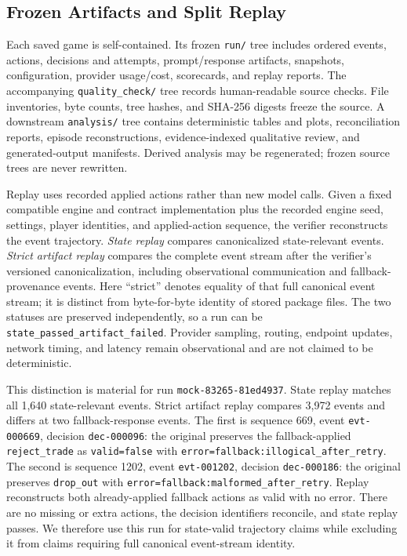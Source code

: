 \documentclass[conference]{IEEEtran}
\newcommand{\runid}[1]{\nolinkurl{#1}}
\begin{document}
\subsection{Frozen Artifacts and Split Replay}
\label{sec:replay}

Each saved game is self-contained. Its frozen \texttt{run/} tree includes
ordered events, actions, decisions and attempts, prompt/response artifacts,
snapshots, configuration, provider usage/cost, scorecards, and replay reports.
The accompanying \texttt{quality\_check/} tree records human-readable source
checks. File inventories, byte counts, tree hashes, and SHA-256 digests freeze
the source. A downstream \texttt{analysis/} tree contains deterministic
tables and plots, reconciliation reports, episode reconstructions,
evidence-indexed qualitative review, and generated-output manifests. Derived
analysis may be regenerated; frozen source trees are never rewritten.

Replay uses recorded applied actions rather than new model calls. Given a fixed
compatible engine and contract implementation plus the recorded engine seed,
settings, player identities, and applied-action sequence, the verifier
reconstructs the event trajectory.
\emph{State replay} compares canonicalized state-relevant events.
\emph{Strict artifact replay} compares the complete event stream after the
verifier's versioned canonicalization, including observational communication
and fallback-provenance events. Here ``strict'' denotes equality of that full
canonical event stream; it is distinct from byte-for-byte identity of stored
package files. The two statuses are preserved independently, so a run can be
\texttt{state\_passed\_artifact\_failed}. Provider sampling, routing, endpoint
updates, network timing, and latency remain observational and are not claimed
to be deterministic.

This distinction is material for run
\runid{mock-83265-81ed4937}. State replay matches all 1,640 state-relevant
events. Strict artifact replay compares 3,972 events and differs at two
fallback-response events. The first is sequence 669, event
\runid{evt-000669}, decision \runid{dec-000096}: the original preserves the
fallback-applied \texttt{reject\_trade} as \texttt{valid=false} with
\texttt{error=fallback:illogical\_after\_retry}. The second is sequence 1202,
event \runid{evt-001202}, decision \runid{dec-000186}: the original preserves
\texttt{drop\_out} with
\texttt{error=fallback:malformed\_after\_retry}. Replay reconstructs both
already-applied fallback actions as valid with no error. There are no missing
or extra actions, the decision identifiers reconcile, and state replay passes.
We therefore use this run for state-valid trajectory claims while excluding it
from claims requiring full canonical event-stream identity.
\end{document}
